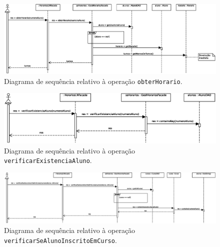 \documentclass[12pt, a4paper]{article}
\begin{document}
\begin{landscape}
        \begin{figure}[H]
            \centering
            \includegraphics[scale=0.8]{Imagens/Modelos/obterHorarioDAO.svg.eps}
            \caption{
                Diagrama de sequência relativo à operação \texttt{obterHorario}.
            }
        \end{figure}

        \vspace*{\fill}
        \pagebreak
        \vspace*{\fill}

        \begin{figure}[H]
            \centering
            \includegraphics[scale=1.0]{Imagens/Modelos/verificarExistenciaAlunoDAO.svg.eps}
            \caption{
                Diagrama de sequência relativo à operação \texttt{verificarExistenciaAluno}.
            }
        \end{figure}

        \vspace*{\fill}
        \pagebreak
        \vspace*{\fill}

        \begin{figure}[H]
            \centering
            \includegraphics[scale=0.65]{Imagens/Modelos/verificarSeAlunoInscritoEmCursoDAO.svg.eps}
            \caption{
                Diagrama de sequência relativo à operação \texttt{verificarSeAlunoInscritoEmCurso}.
            }
        \end{figure}


\end{landscape}
\end{document}
